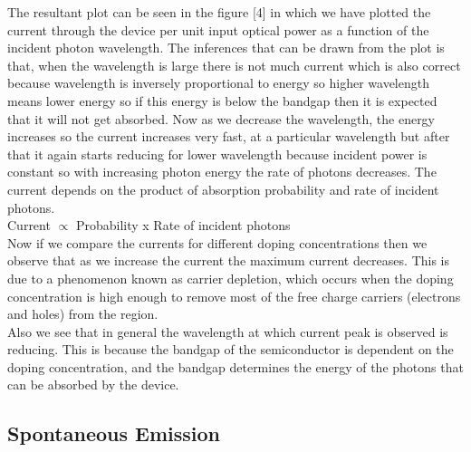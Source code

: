 \documentclass[conference]{IEEEtran}
\begin{document}
The resultant plot can be seen in the figure [4] in which we have plotted the current through the device per unit input optical power as a function of the incident photon wavelength. The inferences that can be drawn from the plot is that, when the wavelength is large there is not much current which is also correct because wavelength is inversely proportional to energy so higher wavelength means lower energy so if this energy is below the bandgap then it is expected that it will not get absorbed. Now as we decrease the wavelength, the energy increases so the current increases very fast, at a particular wavelength but after that it again starts reducing for lower wavelength because incident power is constant so with increasing photon energy the rate of photons decreases. The current depends on the product of absorption probability and rate of incident photons.\\

Current $\propto$ Probability x Rate of incident photons \\

Now if we compare the currents for different doping concentrations then we observe that as we increase the current the maximum current decreases. This is due to a phenomenon known as carrier depletion, which occurs when the doping concentration is high enough to remove most of the free charge carriers (electrons and holes) from the region.\\
Also we see that in general the wavelength at which current peak is observed is reducing. This is because the bandgap of the semiconductor is dependent on the doping concentration, and the bandgap determines the energy of the photons that can be absorbed by the device.

\subsection{Spontaneous Emission}
\end{document}
